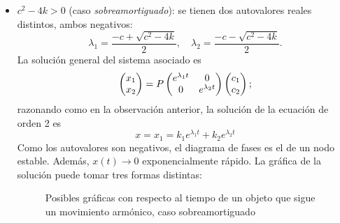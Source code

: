 \documentclass[../ecuaciones_diferenciales.tex]{subfiles}
\begin{document}
\begin{itemize}
	\item \(c^2-4k > 0\) (caso \emph{sobreamortiguado}): se tienen dos autovalores
	      reales distintos, ambos negativos:
	      \[\lambda_1 = \frac{-c + \sqrt{c^2-4k}}{2}, \quad \lambda_2 = \frac{-c -
			      \sqrt{c^2-4k}}{2}.\]
	      La solución general del sistema asociado es
	      \[\begin{pmatrix}x_1 \\ x_2\end{pmatrix} = P \begin{pmatrix}e^{\lambda_1 t} & 0 \\ 0 & e^{\lambda_2 t}\end{pmatrix} \begin{pmatrix}c_1
			      \\ c_2\end{pmatrix};\]
	      razonando como en la observación anterior, la solución de la ecuación de
	      orden 2 es
	      \[x = x_1 = k_1e^{\lambda_1 t} + k_2e^{\lambda_2 t}\]
	      Como los autovalores son negativos, el diagrama de fases es el de un nodo
	      estable. Además, \(x(t) \to 0\) exponencialmente rápido. La gráfica de la
	      solución puede tomar tres formas distintas:
	      \begin{figure}[ht]
		      \centering
		      \begin{subfigure}{0.33\textwidth}
			      \centering
		      \end{subfigure}%
		      \begin{subfigure}{0.33\textwidth}
			      \centering
		      \end{subfigure}%
		      \begin{subfigure}{0.33\textwidth}
			      \centering
		      \end{subfigure}
			\caption{Posibles gráficas con respecto al tiempo de un objeto que
			  sigue un movimiento armónico, caso sobreamortiguado}
	      \end{figure}


\end{itemize}
\end{document}
